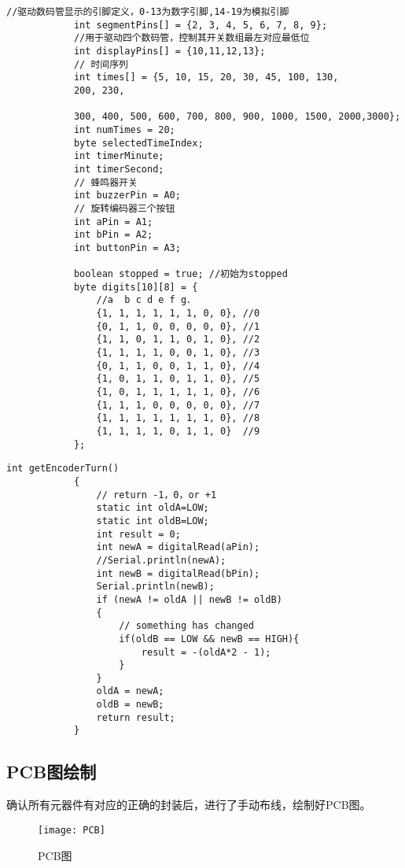 \documentclass{../source/Experiment}
\begin{document}
            \begin{lstlisting}[name = 部分代码]
            //驱动数码管显示的引脚定义，0-13为数字引脚,14-19为模拟引脚
            int segmentPins[] = {2, 3, 4, 5, 6, 7, 8, 9};
            //用于驱动四个数码管，控制其开关数组最左对应最低位
            int displayPins[] = {10,11,12,13};
            // 时间序列
            int times[] = {5, 10, 15, 20, 30, 45, 100, 130,
            200, 230, 
            
            300, 400, 500, 600, 700, 800, 900, 1000, 1500, 2000,3000};
            int numTimes = 20;
            byte selectedTimeIndex;
            int timerMinute;
            int timerSecond;
            // 蜂鸣器开关
            int buzzerPin = A0;
            // 旋转编码器三个按钮
            int aPin = A1;
            int bPin = A2;
            int buttonPin = A3;

            boolean stopped = true; //初始为stopped
            byte digits[10][8] = {
                //a  b c d e f g．
                {1, 1, 1, 1, 1, 1, 0, 0}, //0
                {0, 1, 1, 0, 0, 0, 0, 0}, //1
                {1, 1, 0, 1, 1, 0, 1, 0}, //2
                {1, 1, 1, 1, 0, 0, 1, 0}, //3
                {0, 1, 1, 0, 0, 1, 1, 0}, //4
                {1, 0, 1, 1, 0, 1, 1, 0}, //5
                {1, 0, 1, 1, 1, 1, 1, 0}, //6
                {1, 1, 1, 0, 0, 0, 0, 0}, //7
                {1, 1, 1, 1, 1, 1, 1, 0}, //8
                {1, 1, 1, 1, 0, 1, 1, 0}  //9
            };

            \end{lstlisting}

            \begin{lstlisting}[name = 旋转编码器Arduino代码]
            int getEncoderTurn()
            {
                // return -1，0，or +1 
                static int oldA=LOW; 
                static int oldB=LOW; 
                int result = 0;
                int newA = digitalRead(aPin);
                //Serial.println(newA);
                int newB = digitalRead(bPin);
                Serial.println(newB);
                if (newA != oldA || newB != oldB)
                {
                    // something has changed
                    if(oldB == LOW && newB == HIGH){
                        result = -(oldA*2 - 1);
                    }
                }
                oldA = newA;
                oldB = newB;
                return result;
            }     
            \end{lstlisting}
            \subsection{PCB图绘制}
            确认所有元器件有对应的正确的封装后，进行了手动布线，绘制好PCB图。
            \begin{figure}[H]
                \centering
                \texttt{[image: PCB]}
                \caption{PCB图}
            \end{figure}
\end{document}
